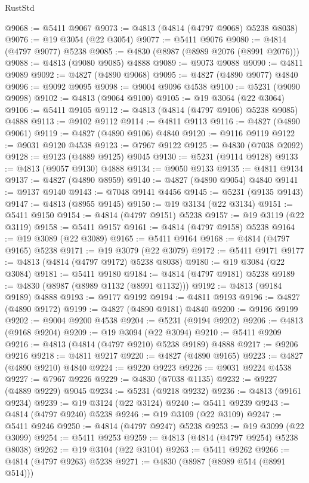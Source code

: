 \begin{lexlean}{RustStd}
\begin{coremodule}
@9068 := @5411 @9067
@9073 := @4813 (@4814 (@4797 @9068) @5238 @8038)
@9076 := @19 @3054 (@22 @3054)
@9077 := @5411 @9076
@9080 := @4814 (@4797 @9077) @5238
@9085 := @4830 (@8987 (@8989 @2076 (@8991 @2076)))
@9088 := @4813 (@9080 @9085) @4888
@9089 := @9073 @9088
@9090 := @4811 @9089
@9092 := @4827 (@4890 @9068)
@9095 := @4827 (@4890 @9077) @4840
@9096 := @9092 @9095
@9098 := @9004 @9096 @4538
@9100 := @5231 (@9090 @9098)
@9102 := @4813 (@9064 @9100)
@9105 := @19 @3064 (@22 @3064)
@9106 := @5411 @9105
@9112 := @4813 (@4814 (@4797 @9106) @5238 @9085) @4888
@9113 := @9102 @9112
@9114 := @4811 @9113
@9116 := @4827 (@4890 @9061)
@9119 := @4827 (@4890 @9106) @4840
@9120 := @9116 @9119
@9122 := @9031 @9120 @4538
@9123 := @7967 @9122
@9125 := @4830 (@7038 @2092)
@9128 := @9123 (@4889 @9125) @9045
@9130 := @5231 (@9114 @9128)
@9133 := @4813 (@9057 @9130) @4888
@9134 := @9050 @9133
@9135 := @4811 @9134
@9137 := @4827 (@4890 @8959)
@9140 := @4827 (@4890 @9054) @4840
@9141 := @9137 @9140
@9143 := @7048 @9141 @4456
@9145 := @5231 (@9135 @9143)
@9147 := @4813 (@8955 @9145)
@9150 := @19 @3134 (@22 @3134)
@9151 := @5411 @9150
@9154 := @4814 (@4797 @9151) @5238
@9157 := @19 @3119 (@22 @3119)
@9158 := @5411 @9157
@9161 := @4814 (@4797 @9158) @5238
@9164 := @19 @3089 (@22 @3089)
@9165 := @5411 @9164
@9168 := @4814 (@4797 @9165) @5238
@9171 := @19 @3079 (@22 @3079)
@9172 := @5411 @9171
@9177 := @4813 (@4814 (@4797 @9172) @5238 @8038)
@9180 := @19 @3084 (@22 @3084)
@9181 := @5411 @9180
@9184 := @4814 (@4797 @9181) @5238
@9189 := @4830 (@8987 (@8989 @1132 (@8991 @1132)))
@9192 := @4813 (@9184 @9189) @4888
@9193 := @9177 @9192
@9194 := @4811 @9193
@9196 := @4827 (@4890 @9172)
@9199 := @4827 (@4890 @9181) @4840
@9200 := @9196 @9199
@9202 := @9004 @9200 @4538
@9204 := @5231 (@9194 @9202)
@9206 := @4813 (@9168 @9204)
@9209 := @19 @3094 (@22 @3094)
@9210 := @5411 @9209
@9216 := @4813 (@4814 (@4797 @9210) @5238 @9189) @4888
@9217 := @9206 @9216
@9218 := @4811 @9217
@9220 := @4827 (@4890 @9165)
@9223 := @4827 (@4890 @9210) @4840
@9224 := @9220 @9223
@9226 := @9031 @9224 @4538
@9227 := @7967 @9226
@9229 := @4830 (@7038 @1135)
@9232 := @9227 (@4889 @9229) @9045
@9234 := @5231 (@9218 @9232)
@9236 := @4813 (@9161 @9234)
@9239 := @19 @3124 (@22 @3124)
@9240 := @5411 @9239
@9243 := @4814 (@4797 @9240) @5238
@9246 := @19 @3109 (@22 @3109)
@9247 := @5411 @9246
@9250 := @4814 (@4797 @9247) @5238
@9253 := @19 @3099 (@22 @3099)
@9254 := @5411 @9253
@9259 := @4813 (@4814 (@4797 @9254) @5238 @8038)
@9262 := @19 @3104 (@22 @3104)
@9263 := @5411 @9262
@9266 := @4814 (@4797 @9263) @5238
@9271 := @4830 (@8987 (@8989 @514 (@8991 @514)))

\end{coremodule}
\end{lexlean}
